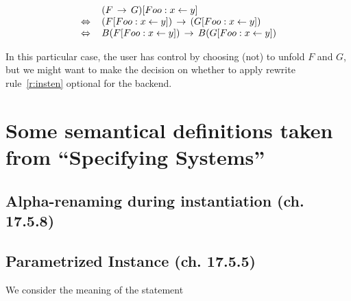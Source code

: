 \documentclass[a4paper]{article}
\theoremstyle{definition}
\begin{document}
\[
\begin{array}{ll}
  & (F \,\rightarrow\, G) [Foo:x \leftarrow y] \\
  \,\Leftrightarrow\, & (F[Foo:x \leftarrow y]) \,\rightarrow\, (G [Foo:x \leftarrow y])\\
  \,\Leftrightarrow\, & B(F[Foo:x \leftarrow y]) \,\rightarrow\, B(G [Foo:x \leftarrow y])\\
\end{array}
\]


In this particular case, the user has control by choosing (not) to unfold $F$
 and $G$, but we might want to make the decision on whether to apply rewrite
 rule~\ref{r:insten} optional for the backend.



%
%
%

\section{Some semantical definitions taken from ``Specifying Systems''}

\subsection{Alpha-renaming during instantiation (ch. 17.5.8)}

\subsection{Parametrized Instance (ch. 17.5.5) }
We consider the meaning of the statement
\end{document}
